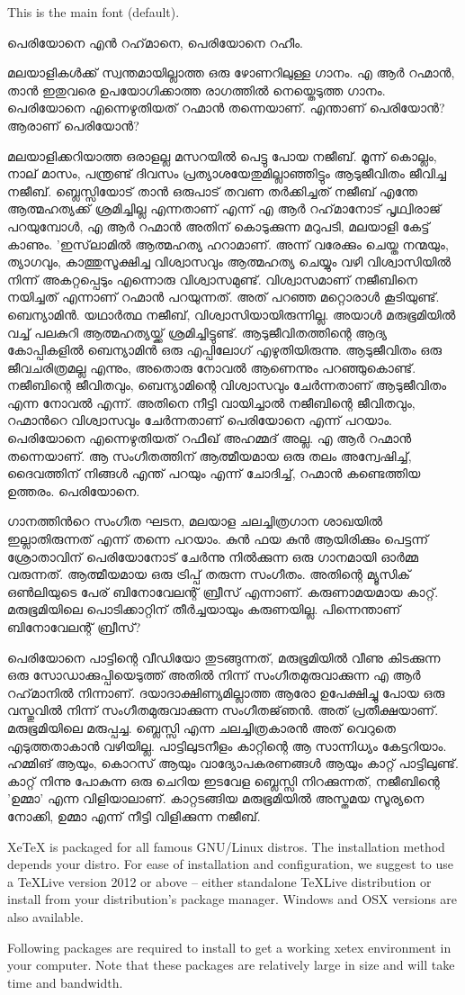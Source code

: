 \documentclass{article}
\begin{document}
This is the main font (default).

പെരിയോനെ എൻ റഹ്‌മാനെ, പെരിയോനെ റഹീം.

മലയാളികൾക്ക് സ്വന്തമായില്ലാത്ത ഒരു ഴോണറിലുള്ള ഗാനം. എ ആർ റഹ്മാൻ, താൻ ഇതുവരെ ഉപയോഗിക്കാത്ത രാഗത്തിൽ നെയ്തെടുത്ത ഗാനം. പെരിയോനെ എന്നെഴുതിയത് റഹ്മാൻ തന്നെയാണ്. എന്താണ് പെരിയോൻ? ആരാണ് പെരിയോൻ?

മലയാളിക്കറിയാത്ത ഒരാളല്ല മസറയിൽ പെട്ടു പോയ നജീബ്. മൂന്ന് കൊല്ലം, നാല് മാസം, പന്ത്രണ്ട് ദിവസം പ്രത്യാശയേതുമില്ലാഞ്ഞിട്ടും ആടുജീവിതം ജീവിച്ച നജീബ്. ബ്ലെസ്സിയോട് താൻ ഒരുപാട് തവണ തർക്കിച്ചത് നജീബ് എന്തേ ആത്മഹത്യക്ക് ശ്രമിച്ചില്ല എന്നതാണ് എന്ന് എ ആർ റഹ്‌മാനോട് പൃഥ്വിരാജ് പറയുമ്പോൾ, എ ആർ റഹ്മാൻ അതിന് കൊടുക്കുന്ന മറുപടി, മലയാളി കേട്ട് കാണും. 'ഇസ്‌ലാമിൽ ആത്മഹത്യ ഹറാമാണ്. അന്ന് വരേക്കും ചെയ്ത നന്മയും, ത്യാഗവും, കാത്തുസൂക്ഷിച്ച വിശ്വാസവും ആത്മഹത്യ ചെയ്യും വഴി വിശ്വാസിയിൽ നിന്ന് അകറ്റപ്പെടും എന്നൊരു വിശ്വാസമുണ്ട്. വിശ്വാസമാണ് നജീബിനെ നയിച്ചത് എന്നാണ് റഹ്മാൻ പറയുന്നത്. അത് പറഞ്ഞ മറ്റൊരാൾ കൂടിയുണ്ട്. ബെന്യാമിൻ. യഥാർത്ഥ നജീബ്, വിശ്വാസിയായിരുന്നില്ല. അയാൾ മരുഭൂമിയിൽ വച്ച് പലകുറി ആത്മഹത്യയ്ക്ക് ശ്രമിച്ചിട്ടുണ്ട്. ആടുജീവിതത്തിന്റെ ആദ്യ കോപ്പികളിൽ ബെന്യാമിൻ ഒരു എപ്പിലോഗ് എഴുതിയിരുന്നു. ആടുജീവിതം ഒരു ജീവചരിത്രമല്ല എന്നും, അതൊരു നോവൽ ആണെന്നും പറഞ്ഞുകൊണ്ട്. നജീബിന്റെ ജീവിതവും, ബെന്യാമിന്റെ വിശ്വാസവും ചേർന്നതാണ് ആടുജീവിതം എന്ന നോവൽ എന്ന്. അതിനെ നീട്ടി വായിച്ചാൽ നജീബിന്റെ ജീവിതവും, റഹ്മാൻറെ വിശ്വാസവും ചേർന്നതാണ് പെരിയോനെ എന്ന് പറയാം. പെരിയോനെ എന്നെഴുതിയത് റഫീഖ് അഹമ്മദ് അല്ല. എ ആർ റഹ്മാൻ തന്നെയാണ്. ആ സംഗീതത്തിന് ആത്മീയമായ ഒരു തലം അന്വേഷിച്ച്, ദൈവത്തിന് നിങ്ങൾ എന്ത് പറയും എന്ന് ചോദിച്ച്, റഹ്മാൻ കണ്ടെത്തിയ ഉത്തരം. പെരിയോനെ.

ഗാനത്തിൻറെ സംഗീത ഘടന, മലയാള ചലച്ചിത്രഗാന ശാഖയിൽ ഇല്ലാതിരുന്നത് എന്ന് തന്നെ പറയാം. കുൻ ഫയ കുൻ ആയിരിക്കും പെട്ടന്ന് ശ്രോതാവിന് പെരിയോനോട് ചേർന്നു നിൽക്കുന്ന ഒരു ഗാനമായി ഓർമ്മ വരുന്നത്. ആത്മീയമായ ഒരു ട്രിപ്പ് തരുന്ന സംഗീതം. അതിന്റെ മ്യൂസിക് ഒൺലിയുടെ പേര് ബിനോവേലന്റ് ബ്രീസ് എന്നാണ്. കരുണാമയമായ കാറ്റ്. മരുഭൂമിയിലെ പൊടിക്കാറ്റിന് തീർച്ചയായും കരുണയില്ല. പിന്നെന്താണ് ബിനോവേലന്റ് ബ്രീസ്?

പെരിയോനെ പാട്ടിന്റെ വീഡിയോ തുടങ്ങുന്നത്, മരുഭൂമിയിൽ വീണു കിടക്കുന്ന ഒരു സോഡാക്കുപ്പിയെടുത്ത് അതിൽ നിന്ന് സംഗീതമുരുവാക്കുന്ന എ ആർ റഹ്‌മാനിൽ നിന്നാണ്. ദയാദാക്ഷിണ്യമില്ലാത്ത ആരോ ഉപേക്ഷിച്ചു പോയ ഒരു വസ്തുവിൽ നിന്ന് സംഗീതമുരുവാക്കുന്ന സംഗീതജ്‌ഞൻ. അത് പ്രതീക്ഷയാണ്. മരുഭൂമിയിലെ മരുപ്പച്ച. ബ്ലെസ്സി എന്ന ചലച്ചിത്രകാരൻ അത് വെറുതെ എടുത്തതാകാൻ വഴിയില്ല. പാട്ടിലുടനീളം കാറ്റിന്റെ ആ സാന്നിധ്യം കേട്ടറിയാം. ഹമ്മിങ് ആയും, കൊറസ് ആയും വാദ്യോപകരണങ്ങൾ ആയും കാറ്റ് പാട്ടിലുണ്ട്. കാറ്റ് നിന്നു പോകുന്ന ഒരു ചെറിയ ഇടവേള ബ്ലെസ്സി നിറക്കുന്നത്, നജീബിന്റെ 'ഉമ്മാ' എന്ന വിളിയാലാണ്. കാറ്റടങ്ങിയ മരുഭൂമിയിൽ അസ്തമയ സൂര്യനെ നോക്കി, ഉമ്മാ എന്ന് നീട്ടി വിളിക്കുന്ന നജീബ്.

XeTeX is packaged for all famous GNU/Linux distros. The installation method depends your distro. For ease of installation and configuration, we suggest to use a TeXLive version 2012 or above – either standalone TeXLive distribution or install from your distribution’s package manager. Windows and OSX versions are also available.

Following packages are required to install to get a working xetex environment in your computer. Note that these packages are relatively large in size and will take time and bandwidth.
\end{document}
